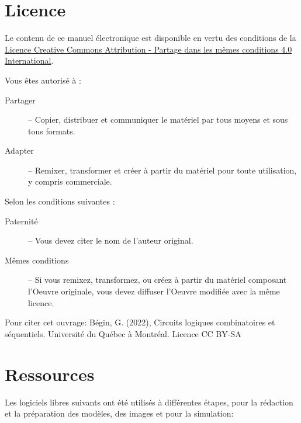 \documentclass[letter, oneside]{book}
\begin{document}
\section*{Licence}
\label{sec:org7938172}

\begin{center}
\href{https://creativecommons.org/licenses/by/4.0/deed.fr}{} 
\end{center}


Le contenu de ce manuel électronique est
disponible en vertu des conditions de la
\href{https://creativecommons.org/licenses/by-sa/4.0/deed.fr}{Licence
Creative Commons Attribution - Partage dans les mêmes conditions 4.0
International}.

Vous êtes autorisé à : 

\begin{description}
\item[{Partager}] – Copier, distribuer et communiquer le matériel par tous
moyens et sous tous formats.
\item[{Adapter}] – Remixer, transformer et créer à partir du matériel pour
toute utilisation, y compris commerciale.
\end{description}

Selon les conditions suivantes :

\begin{description}
\item[{Paternité}] – Vous devez citer le nom de l'auteur original.
\item[{Mêmes conditions}] – Si vous remixez, transformez, ou créez à
partir du matériel composant l'Oeuvre originale, vous devez diffuser
l'Oeuvre modifiée avec la même licence.
\end{description}


Pour citer cet ouvrage: Bégin, G. (2022), Circuits logiques
combinatoires et séquentiels. Université du Québec à Montréal. Licence CC BY-SA

\begin{center}
\href{https://uqam.ca/}{} 
\end{center}

\section*{Ressources}
\label{sec:org8c7ac83}

Les logiciels libres suivants ont été utilisés à différentes étapes,
pour la rédaction et la préparation des modèles, des images et pour la
simulation:
\end{document}
